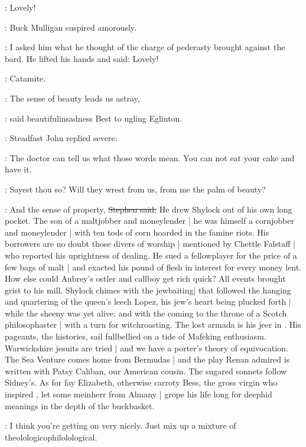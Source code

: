 \mulligan:
Lovely!

:
Buck Mulligan suspired amorously.

\mulligan:
I asked him what he thought of the charge of pederasty brought against the bard.
He lifted his hands and said:
Lovely!

\StephenInt:
Catamite.

\best:
The sense of beauty leads us astray,

:
said beautifulinsadness Best to ugling Eglinton.

:
Steadfast John replied severe:

\eglinton:
The doctor can tell us what those words mean.
You can not eat your cake and have it.

\StephenInt:
Sayest thou so?
Will they wrest from us,
from me the palm of beauty?

\Stephen:
And the sense of property,
\sout{Stephen said.}
He drew Shylock out of his own long pocket.
The son of a maltjobber and moneylender |
he was himself a cornjobber and moneylender |
with ten tods of corn hoarded in the famine riots.
His borrowers are no doubt those divers of worship |
mentioned by Chettle Falstaff |
who reported his uprightness of dealing.
He sued a fellowplayer for the price of a few bags of malt |
and exacted his pound of flesh in interest for every money lent.
How else could Aubrey's ostler and callboy get rich quick?
All events brought grist to his mill.
Shylock chimes with the jewbaiting|
that followed the hanging and quartering of the queen's leech Lopez,
his jew's heart being plucked forth |
while the sheeny was yet alive:
 and 
with the coming to the throne of a Scotch philosophaster |
with a turn for witchroasting.
The lost armada is his jeer in .
His pageants, the histories,
sail fullbellied on a tide of Mafeking enthusiasm.
Warwickshire jesuits are tried |
and we have a porter's theory of equivocation.
The Sea Venture comes home from Bermudas |
and the play Renan admired is written with Patsy Caliban,
our American cousin.
The sugared sonnets follow Sidney's.
As for fay Elizabeth,
otherwise carroty Bess,
the gross virgin who inspired ,
let some meinherr from Almany |
grope his life long for deephid meanings
in the depth of the buckbasket.

\StephenInt:
I think you're getting on very nicely.
Just mix up a mixture of theolologicophilolological.

